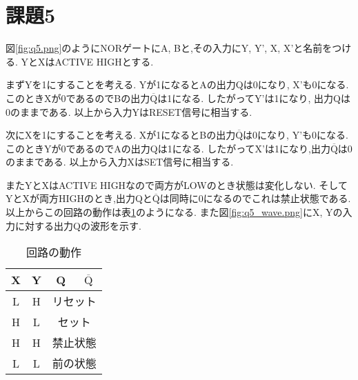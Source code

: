 \section{課題5}
図\ref{fig:q5.png}のようにNORゲートにA, Bと,その入力にY, Y', X, X'と名前をつける.
YとXはACTIVE HIGHとする.

まずYを1にすることを考える.
Yが1になるとAの出力Qは0になり, X'も0になる.
このときXが0であるのでBの出力$\mathrm{\overline{Q}}$は1になる.
したがってY'は1になり, 出力Qは0のままである.
以上から入力YはRESET信号に相当する.

次にXを1にすることを考える.
Xが1になるとBの出力$\mathrm{\overline{Q}}$は0になり, Y'も0になる.
このときYが0であるのでAの出力Qは1になる.
したがってX'は1になり,出力$\mathrm{\overline{Q}}$は0のままである.
以上から入力XはSET信号に相当する.

またYとXはACTIVE HIGHなので両方がLOWのとき状態は変化しない.
そしてYとXが両方HIGHのとき,出力Qと$\mathrm{\overline{Q}}$は同時に0になるのでこれは禁止状態である.
以上からこの回路の動作は表\ref{tab:q5}のようになる.
また図\ref{fig:q5_wave.png}にX, Yの入力に対する出力Qの波形を示す.
\begin{table}[h]
\caption{回路の動作}
\label{tab:q5}
\centering
\begin{tabular}{cccc}
\hline
X&Y&Q&$\mathrm{\overline{Q}}$\\
\hline \hline
L&H&\multicolumn{2}{c}{リセット}\\
H&L&\multicolumn{2}{c}{セット}\\
H&H&\multicolumn{2}{c}{禁止状態}\\
L&L&\multicolumn{2}{c}{前の状態}\\
\hline
\end{tabular}
\end{table}
